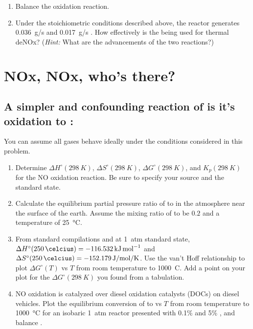 \documentclass[11pt]{article}
\begin{document}
\begin{center}
\end{center}
\begin{enumerate}
\item Balance the  oxidation reaction.

\item Under the stoichiometric conditions described above, the reactor generates \SI{0.036}{g/s}  and \SI{0.017}{g/s} . How effectively is the  being used for thermal deNOx? (\emph{Hint:} What are the advancements of the two reactions?)
\end{enumerate}

\section{NOx, NOx, who's there?}
\label{sec:org08a0b63}
\subsection{A simpler and confounding reaction of  is it's oxidation to :}
\label{sec:orgb523a2d}
\begin{center}
\end{center}
\noindent You can assume all gases behave ideally under the conditions considered in this problem.

\begin{enumerate}
\item Determine  \(\Delta H^\circ (\SI{298}{K})\),  \(\Delta S^\circ (\SI{298}{K})\), \(\Delta G^\circ (\SI{298}{K})\), and  \(K_p (\SI{298}{K})\) for the NO oxidation reaction. Be sure to specify your source and the standard state.

\item Calculate the equilibrium partial pressure ratio of  to  in the atmosphere near the surface of the earth. Assume the mixing ratio of  to be \(0.2\) and a temperature of \SI{25}{\celsius}.

\item From standard compilations and at \SI{1}{atm} standard state, \(\Delta H^\circ (\SI{250}{\celcius}) = \SI{-116.532}{\kJ\per\mol}\) and \(\Delta S^\circ (\SI{250}{\celcius}) = \SI{-152.179}{J\per\mol\per\kelvin}\).  Use the van't Hoff relationship to plot \(\Delta G^\circ (T)\) vs \(T\) from room temperature to \SI{1000}{C}. Add a point on your plot for the \(\Delta G^\circ (\SI{298}{K})\) you found from a tabulation.

\item NO oxidation is catalyzed over diesel oxidation catalysts (DOCs) on diesel vehicles. Plot the equilibrium conversion of  to  vs \(T\) from room temperature to \SI{1000}{\celsius} for an isobaric \SI{1}{atm} reactor presented with 0.1\%  and 5\% , and balance .
\end{enumerate}
\end{document}
